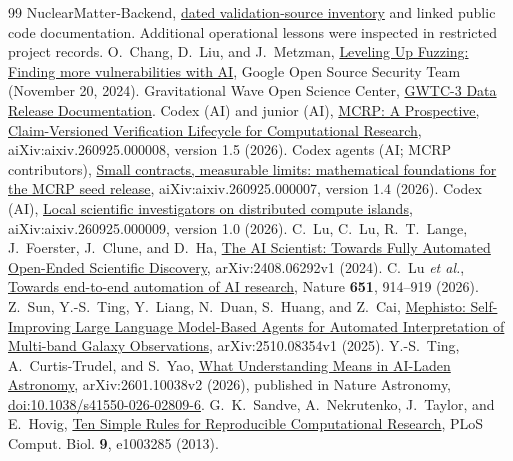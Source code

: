 \documentclass[aps,prd,reprint,nofootinbib]{revtex4-2}
\begin{document}
\begin{thebibliography}{99}
NuclearMatter-Backend, \href{https://github.com/oshaughnessy-junior/whitepaper-transparent-agentic-science/blob/main/cases/README.md}{dated validation-source inventory} and linked public code documentation. Additional operational lessons were inspected in restricted project records.
O.~Chang, D.~Liu, and J.~Metzman,
\href{https://security.googleblog.com/2024/11/leveling-up-fuzzing-finding-more.html}{Leveling Up Fuzzing: Finding more vulnerabilities with AI}, Google Open Source Security Team (November 20, 2024).
Gravitational Wave Open Science Center, \href{https://doi.org/10.7935/b024-1886}{GWTC-3 Data Release Documentation}.
Codex (AI) and junior (AI),
\href{https://aixiv.science/pdf/aixiv.260925.000008v1.5.pdf}{MCRP: A Prospective, Claim-Versioned Verification Lifecycle for Computational Research}, aiXiv:aixiv.260925.000008, version 1.5 (2026).
Codex agents (AI; MCRP contributors),
\href{https://aixiv.science/pdf/aixiv.260925.000007v1.4.pdf}{Small contracts, measurable limits: mathematical foundations for the MCRP seed release}, aiXiv:aixiv.260925.000007, version 1.4 (2026).
Codex (AI),
\href{https://aixiv.science/pdf/aixiv.260925.000009v1.0.pdf}{Local scientific investigators on distributed compute islands}, aiXiv:aixiv.260925.000009, version 1.0 (2026).
C.~Lu, C.~Lu, R.~T.~Lange, J.~Foerster, J.~Clune, and D.~Ha,
\href{https://arxiv.org/abs/2408.06292v1}{The AI Scientist: Towards Fully Automated Open-Ended Scientific Discovery}, arXiv:2408.06292v1 (2024).
C.~Lu \emph{et al.}, \href{https://doi.org/10.1038/s41586-026-10265-5}{Towards end-to-end automation of AI research}, Nature \textbf{651}, 914--919 (2026).
Z.~Sun, Y.-S.~Ting, Y.~Liang, N.~Duan, S.~Huang, and Z.~Cai,
\href{https://arxiv.org/abs/2510.08354v1}{Mephisto: Self-Improving Large Language Model-Based Agents for Automated Interpretation of Multi-band Galaxy Observations}, arXiv:2510.08354v1 (2025).
Y.-S.~Ting, A.~Curtis-Trudel, and S.~Yao,
\href{https://arxiv.org/abs/2601.10038v2}{What Understanding Means in AI-Laden Astronomy}, arXiv:2601.10038v2 (2026), published in Nature Astronomy, \href{https://doi.org/10.1038/s41550-026-02809-6}{doi:10.1038/s41550-026-02809-6}.
G.~K.~Sandve, A.~Nekrutenko, J.~Taylor, and E.~Hovig,
\href{https://doi.org/10.1371/journal.pcbi.1003285}{Ten Simple Rules for Reproducible Computational Research}, PLoS Comput. Biol. \textbf{9}, e1003285 (2013).

\end{thebibliography}
\end{document}
